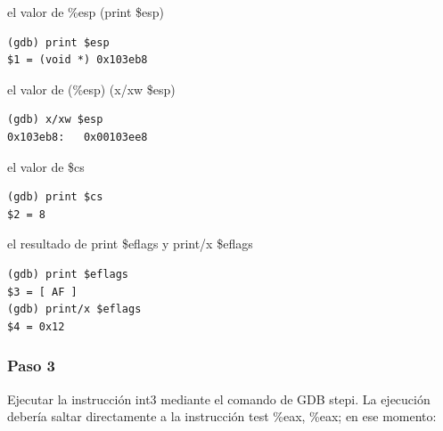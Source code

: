 \documentclass[a4paper]{article}
\begin{document}
\begin{list}{•}
\begin{lstlisting}
\end{lstlisting}
\item el valor de \%esp (print \$esp) \newline
\begin{lstlisting}
(gdb) print $esp
$1 = (void *) 0x103eb8
\end{lstlisting}

\item el valor de (\%esp) (x/xw \$esp)
\begin{lstlisting}
(gdb) x/xw $esp
0x103eb8:	0x00103ee8

\end{lstlisting}

\item el valor de \$cs
\begin{lstlisting}
(gdb) print $cs
$2 = 8

\end{lstlisting}

\item el resultado de print \$eflags y print/x \$eflags 
\begin{lstlisting}
(gdb) print $eflags
$3 = [ AF ]
(gdb) print/x $eflags
$4 = 0x12
\end{lstlisting}

\end{list}

\subsubsection*{Paso 3}
Ejecutar la instrucción int3 mediante el comando de GDB stepi. La ejecución debería saltar directamente a la instrucción test \%eax, \%eax; en ese momento:
\end{document}
